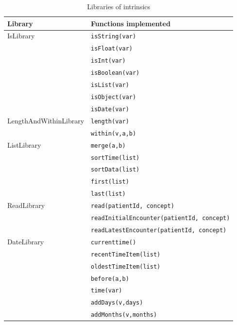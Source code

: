 \documentclass[12pt,letterpaper]{article}
\begin{document}
{\begin{table}
\begin{center}
\begin{tabular} { l | l }
\textbf{Library}  & \textbf{Functions implemented}\\ \hline
IsLibrary         & \texttt{isString(var)}        \\
                  & \texttt{isFloat(var)}         \\
                  & \texttt{isInt(var)}           \\
                  & \texttt{isBoolean(var)}       \\
                  & \texttt{isList(var)}          \\
                  & \texttt{isObject(var)}        \\
                  & \texttt{isDate(var)}          \\ \hline
LengthAndWithinLibrary
                  & \texttt{length(var)}          \\
                  & \texttt{within(v,a,b)}        \\ \hline
ListLibrary       & \texttt{merge(a,b)}           \\
                  & \texttt{sortTime(list)}       \\
                  & \texttt{sortData(list)}       \\
                  & \texttt{first(list)}          \\
                  & \texttt{last(list)}           \\ \hline
ReadLibrary       & \texttt{read(patientId,
                                 concept)}        \\
                  & \texttt{readInitialEncounter(patientId,
                                 concept)}        \\
                  & \texttt{readLatestEncounter(patientId,
                                 concept)}        \\ \hline
DateLibrary       & \texttt{currenttime()}        \\
                  & \texttt{recentTimeItem(list)} \\
                  & \texttt{oldestTimeItem(list)} \\
                  & \texttt{before(a,b)}          \\
                  & \texttt{time(var)}            \\
                  & \texttt{addDays(v,days)}      \\
                  & \texttt{addMonths(v,months)}  \\ \hline
\end{tabular}
\end{center}
\caption{Libraries of intrinsics}
\label{tab:LIBRARIES}
\end{table}

}
\end{document}
